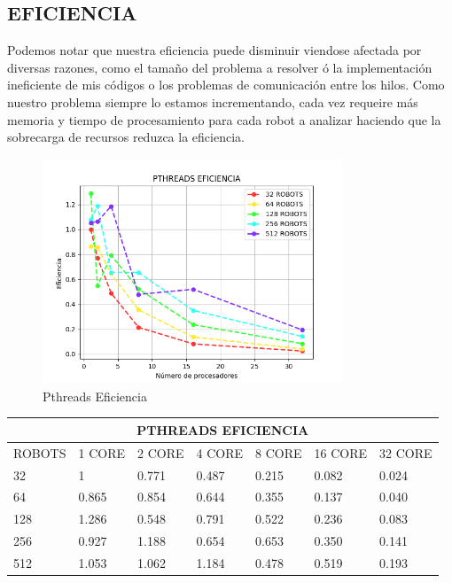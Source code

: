 \documentclass[oneside,twocolumn]{article}
\begin{document}
\newpage
\subsection{EFICIENCIA}

Podemos notar que nuestra eficiencia puede disminuir viendose afectada por diversas razones, como el tamaño del problema a resolver ó la implementación ineficiente de mis códigos o los problemas de comunicación entre los hilos. Como nuestro problema siempre lo estamos incrementando, cada vez requeire más memoria y tiempo de procesamiento para cada robot a analizar haciendo que la sobrecarga de recursos reduzca la eficiencia.

\begin{figure}[h]
    \centering
    \includegraphics[width=0.80\textwidth]{graficos/pthreads/pthreads_eff.png}
    \caption{Pthreads Eficiencia}
    \label{fig:secuencial}
\end{figure}

\begin{center}
\begin{tabular}{ |p{2cm}||p{2cm}||p{2cm}||p{2cm}||p{2cm}||p{2cm}||p{2cm}| }
 \hline
 \multicolumn{7}{|c|}{PTHREADS EFICIENCIA} \\
 \hline
 ROBOTS & 1 CORE & 2 CORE & 4 CORE & 8 CORE & 16 CORE & 32 CORE\\
 \hline
 32   & 1     & 0.771 & 0.487 & 0.215 & 0.082 & 0.024\\ \hline
 64   & 0.865 & 0.854 & 0.644 & 0.355 & 0.137 & 0.040\\ \hline
 128  & 1.286 & 0.548 & 0.791 & 0.522 & 0.236 & 0.083\\ \hline
 256  & 0.927 & 1.188 & 0.654 & 0.653 & 0.350 & 0.141\\ \hline
 512  & 1.053 & 1.062 & 1.184 & 0.478 & 0.519 & 0.193\\ \hline
 \hline
\end{tabular}
\end{center}
\end{document}

